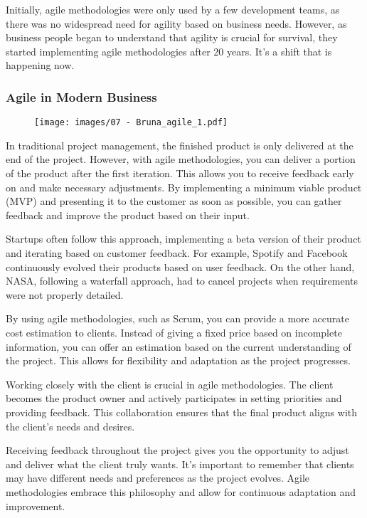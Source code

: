 Initially, agile methodologies were only used by a few development
teams, as there was no widespread need for agility based on business
needs. However, as business people began to understand that agility is
crucial for survival, they started implementing agile methodologies
after 20 years. It's a shift that is happening now.

\subsubsection{Agile in Modern Business}

\begin{figure}[!h]
    \centering
    \texttt{[image: images/07 - Bruna\_agile\_1.pdf]}
\end{figure}

In traditional project management, the finished product is only
delivered at the end of the project. However, with agile methodologies,
you can deliver a portion of the product after the first iteration. This
allows you to receive feedback early on and make necessary adjustments.
By implementing a minimum viable product (MVP) and presenting it to the
customer as soon as possible, you can gather feedback and improve the
product based on their input.

Startups often follow this approach, implementing a beta version of
their product and iterating based on customer feedback. For example,
Spotify and Facebook continuously evolved their products based on user
feedback. On the other hand, NASA, following a waterfall approach, had
to cancel projects when requirements were not properly detailed.

By using agile methodologies, such as Scrum, you can provide a more
accurate cost estimation to clients. Instead of giving a fixed price
based on incomplete information, you can offer an estimation based on
the current understanding of the project. This allows for flexibility
and adaptation as the project progresses.

Working closely with the client is crucial in agile methodologies. The
client becomes the product owner and actively participates in setting
priorities and providing feedback. This collaboration ensures that the
final product aligns with the client's needs and desires.

Receiving feedback throughout the project gives you the opportunity to
adjust and deliver what the client truly wants. It's important to
remember that clients may have different needs and preferences as the
project evolves. Agile methodologies embrace this philosophy and allow
for continuous adaptation and improvement.

